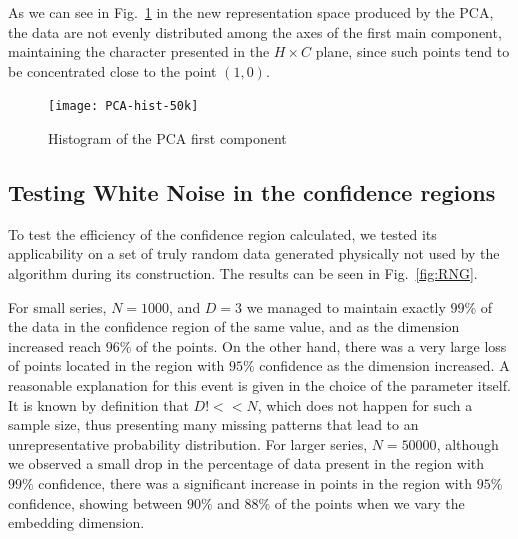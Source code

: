 As we can see in Fig.~\ref{fig:PCA-Hist} in the new representation space produced by the PCA, the data are not evenly distributed among the axes of the first main component, maintaining the character presented in the $H \times C$ plane, since such points tend to be concentrated close to the point $(1, 0)$.

\begin{figure}[H]
    \centering
    \texttt{[image: PCA-hist-50k]}
    \caption{Histogram of the PCA first component }
    \label{fig:PCA-Hist}
\end{figure}

\subsection{Testing White Noise in the confidence regions}

To test the efficiency of the confidence region calculated, we tested its applicability on a set of truly random data generated physically not used by the algorithm during its construction. 
The results can be seen in Fig.~\ref{fig:RNG}.

For small series, $N = 1000$, and $D = 3$ we managed to maintain exactly $99\%$ of the data in the confidence region of the same value, and as the dimension increased reach $96\%$ of the points.
On the other hand, there was a very large loss of points located in the region with $95\%$ confidence as the dimension increased.
A reasonable explanation for this event is given in the choice of the parameter itself.
It is known by definition that $D! << N$, which does not happen for such a sample size, thus presenting many missing patterns that lead to an unrepresentative probability distribution.
For larger series, $N = 50000$, although we observed a small drop in the percentage of data present in the region with $99\%$ confidence, there was a significant increase in points in the region with $95\%$ confidence, showing between $90\%$ and $88\%$ of the points when we vary the embedding dimension.

